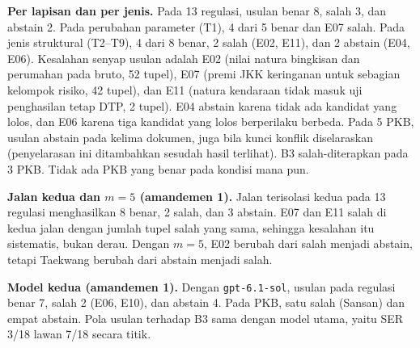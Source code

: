 \documentclass[conference]{IEEEtran}
\makeatletter
\DeclareRobustCommand{\en}[1]{{\usefont{\f@encoding}{\f@family}{\f@series}{it}#1\/}}
\makeatother
\begin{document}
\textbf{Per lapisan dan per jenis.} Pada 13 regulasi, usulan benar 8, salah 3, dan \en{abstain} 2. Pada perubahan parameter (T1), 4 dari 5 benar dan E07 salah. Pada jenis struktural (T2--T9), 4 dari 8 benar, 2 salah (E02, E11), dan 2 \en{abstain} (E04, E06). Kesalahan senyap usulan adalah E02 (nilai natura bingkisan dan perumahan pada bruto, 52 tupel), E07 (premi JKK keringanan untuk sebagian kelompok risiko, 42 tupel), dan E11 (natura kendaraan tidak masuk uji penghasilan tetap DTP, 2 tupel). E04 \en{abstain} karena tidak ada kandidat yang lolos, dan E06 karena tiga kandidat yang lolos berperilaku berbeda. Pada 5 PKB, usulan \en{abstain} pada kelima dokumen, juga bila kunci konflik diselaraskan (penyelarasan ini ditambahkan sesudah hasil terlihat). B3 salah-diterapkan pada 3 PKB. Tidak ada PKB yang benar pada kondisi mana pun.

\textbf{Jalan kedua dan $m = 5$ (amandemen 1).} Jalan terisolasi kedua pada 13 regulasi menghasilkan 8 benar, 2 salah, dan 3 \en{abstain}. E07 dan E11 salah di kedua jalan dengan jumlah tupel salah yang sama, sehingga kesalahan itu sistematis, bukan derau. Dengan $m = 5$, E02 berubah dari salah menjadi \en{abstain}, tetapi Taekwang berubah dari \en{abstain} menjadi salah.

\textbf{Model kedua (amandemen 1).} Dengan \texttt{gpt-6.1-sol}, usulan pada regulasi benar 7, salah 2 (E06, E10), dan \en{abstain} 4. Pada PKB, satu salah (Sansan) dan empat \en{abstain}. Pola usulan terhadap B3 sama dengan model utama, yaitu SER 3/18 lawan 7/18 secara titik.
\end{document}
